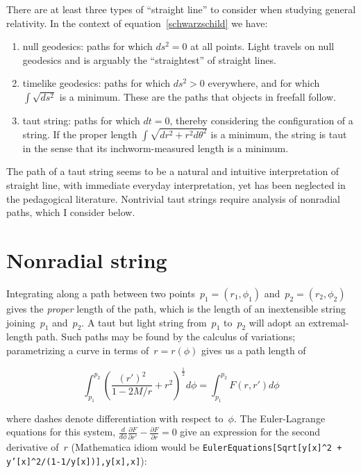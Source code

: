 \documentclass[review]{elsarticle}
\begin{document}
There are at least three types of ``straight line'' to consider when
studying general relativity.  In the context of
equation~\ref{schwarzschild} we have:

\begin{enumerate}
\item null geodesics: paths for which $ds^2=0$ at all points.  Light
  travels on null geodesics and is arguably the ``straightest'' of
  straight lines.
\item timelike geodesics: paths for which $ds^2>0$ everywhere, and for
  which $\int\sqrt{ds^2}$ is a minimum.  These are the paths that
  objects in freefall follow.
\item taut string: paths for which $dt=0$, thereby considering the
  configuration of a string.  If the proper length
  $\int\sqrt{dr^2+r^2d\theta^2}$ is a minimum, the string is taut in
  the sense that its inchworm-measured length is a minimum.
\end{enumerate}

The path of a taut string seems to be a natural and intuitive
interpretation of straight line, with immediate everyday
interpretation, yet has been neglected in the pedagogical literature.
Nontrivial taut strings require analysis of nonradial paths, which I
consider below.

\section{Nonradial string}
Integrating along a path between two
points~$p_1=\left(r_1,\phi_1\right)$ and~$p_2=\left(r_2,\phi_2\right)$
gives the {\em proper} length of the path, which is the length of an
inextensible string joining~$p_1$ and~$p_2$.  A taut but light string
from~$p_1$ to~$p_2$ will adopt an extremal-length path.  Such paths
may be found by the calculus of variations; parametrizing a curve in
terms of~$r=r\left(\phi\right)$ gives us a path length of


\begin{equation}
  \int_{p_1}^{p_2}\left(\frac{\left(r'\right)^2}{1-2M/r} + r^2\right)^\frac{1}{2}d\phi=
  \int_{p_1}^{p_2}F\left(r,r'\right)d\phi
\end{equation}

\noindent where dashes denote differentiation with respect to~$\phi$.
The Euler-Lagrange equations for this system,
$\frac{d}{d\phi}\frac{\partial F}{\partial r'}-\frac{\partial
  F}{\partial r}=0$ give an expression for the second derivative
of~$r$ (Mathematica idiom would be {\tt EulerEquations[Sqrt[y[x]\^{}2
      + y'[x]\^{}2/(1-1/y[x])],y[x],x]}):
\end{document}
